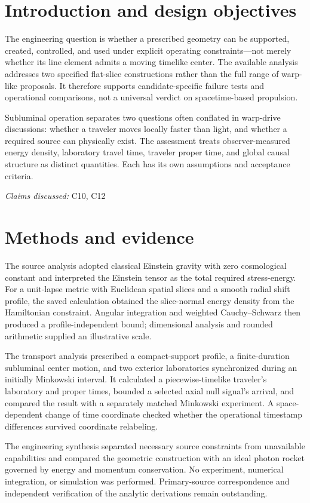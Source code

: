 \documentclass[11pt]{article}
\begin{document}
\section{Introduction and design objectives}
The engineering question is whether a prescribed geometry can be supported, created, controlled, and used under explicit operating constraints—not merely whether its line element admits a moving timelike center. The available analysis addresses two specified flat-slice constructions rather than the full range of warp-like proposals. It therefore supports candidate-specific failure tests and operational comparisons, not a universal verdict on spacetime-based propulsion.

Subluminal operation separates two questions often conflated in warp-drive discussions: whether a traveler moves locally faster than light, and whether a required source can physically exist. The assessment treats observer-measured energy density, laboratory travel time, traveler proper time, and global causal structure as distinct quantities. Each has its own assumptions and acceptance criteria.

\textit{Claims discussed: }C10, C12
\section{Methods and evidence}
The source analysis adopted classical Einstein gravity with zero cosmological constant and interpreted the Einstein tensor as the total required stress-energy. For a unit-lapse metric with Euclidean spatial slices and a smooth radial shift profile, the saved calculation obtained the slice-normal energy density from the Hamiltonian constraint. Angular integration and weighted Cauchy–Schwarz then produced a profile-independent bound; dimensional analysis and rounded arithmetic supplied an illustrative scale.

The transport analysis prescribed a compact-support profile, a finite-duration subluminal center motion, and two exterior laboratories synchronized during an initially Minkowski interval. It calculated a piecewise-timelike traveler's laboratory and proper times, bounded a selected axial null signal's arrival, and compared the result with a separately matched Minkowski experiment. A space-dependent change of time coordinate checked whether the operational timestamp differences survived coordinate relabeling.

The engineering synthesis separated necessary source constraints from unavailable capabilities and compared the geometric construction with an ideal photon rocket governed by energy and momentum conservation. No experiment, numerical integration, or simulation was performed. Primary-source correspondence and independent verification of the analytic derivations remain outstanding.
\end{document}
